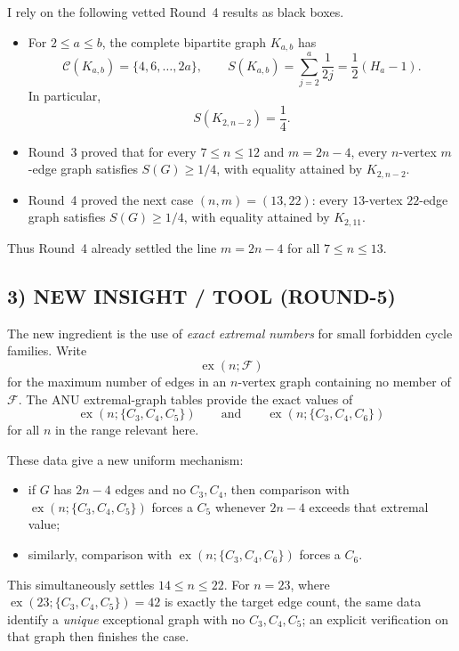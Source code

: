 I rely on the following vetted Round~4 results as black boxes.

\begin{itemize}
\item[(F1)] For $2\le a\le b$, the complete bipartite graph $K_{a,b}$ has
\[
\mathcal C(K_{a,b})=\{4,6,\dots,2a\},
\qquad
S(K_{a,b})=\sum_{j=2}^a\frac1{2j}=\frac12(H_a-1).
\]
In particular,
\[
S(K_{2,n-2})=\frac14.
\]

\item[(F2)] Round~3 proved that for every $7\le n\le 12$ and $m=2n-4$, every $n$-vertex $m$-edge graph satisfies $S(G)\ge 1/4$, with equality attained by $K_{2,n-2}$.

\item[(F3)] Round~4 proved the next case $(n,m)=(13,22)$: every $13$-vertex $22$-edge graph satisfies $S(G)\ge 1/4$, with equality attained by $K_{2,11}$.
\end{itemize}

Thus Round~4 already settled the line $m=2n-4$ for all $7\le n\le 13$.

\subsection*{3) NEW INSIGHT / TOOL (ROUND-5)}

The new ingredient is the use of \emph{exact extremal numbers} for small forbidden cycle families.
Write
\[
\operatorname{ex}(n;\mathcal F)
\]
for the maximum number of edges in an $n$-vertex graph containing no member of $\mathcal F$.
The ANU extremal-graph tables provide the exact values of
\[
\operatorname{ex}(n;\{C_3,C_4,C_5\})
\qquad\text{and}\qquad
\operatorname{ex}(n;\{C_3,C_4,C_6\})
\]
for all $n$ in the range relevant here.

These data give a new uniform mechanism:
\begin{itemize}
\item if $G$ has $2n-4$ edges and no $C_3,C_4$, then comparison with $\operatorname{ex}(n;\{C_3,C_4,C_5\})$ forces a $C_5$ whenever $2n-4$ exceeds that extremal value;
\item similarly, comparison with $\operatorname{ex}(n;\{C_3,C_4,C_6\})$ forces a $C_6$.
\end{itemize}

This simultaneously settles $14\le n\le 22$.
For $n=23$, where $\operatorname{ex}(23;\{C_3,C_4,C_5\})=42$ is exactly the target edge count, the same data identify a \emph{unique} exceptional graph with no $C_3,C_4,C_5$; an explicit verification on that graph then finishes the case.

